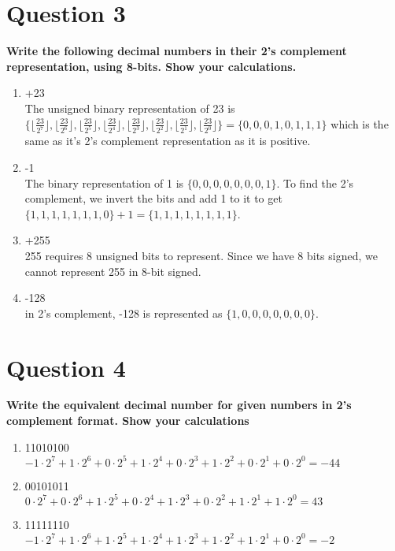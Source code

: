 \section{Question 3}
\textbf{Write the following decimal numbers in their 2's complement representation, using 8-bits. Show your calculations.}
\begin{enumerate}
    \item +23
    \\ The unsigned binary representation of 23 is $\{\lfloor\frac{23}{2^7}\rfloor, \lfloor\frac{23}{2^6}\rfloor, \lfloor\frac{23}{2^5}\rfloor, \lfloor\frac{23}{2^4}\rfloor, \lfloor\frac{23}{2^3}\rfloor, \lfloor\frac{23}{2^2}\rfloor, \lfloor\frac{23}{2^1}\rfloor, \lfloor\frac{23}{2^0}\rfloor\} = \{0, 0, 0, 1, 0, 1, 1, 1\}$
    which is the same as it's 2's complement representation as it is positive.
    \item -1 
    \\ The binary representation of 1 is $\{0, 0, 0, 0, 0, 0, 0, 1\}$. To find the 2's complement, we invert the bits and add 1 to it to get $\{1, 1, 1, 1, 1, 1, 1, 0\} + 1 = \{1, 1, 1, 1, 1, 1, 1, 1\}$. 
    \item +255
    \\ 255 requires 8 unsigned bits to represent. Since we have 8 bits signed, we cannot represent 255 in 8-bit signed.
    \item -128
    \\ in 2's complement, -128 is represented as $\{1, 0, 0, 0, 0, 0, 0, 0\}$. 
\end{enumerate}

\section{Question 4}
\textbf{ Write the equivalent decimal number for given numbers in 2's complement format. Show your calculations}
\begin{enumerate}
    \item 11010100
    \\ $-1\cdot2^7 + 1\cdot2^6 + 0\cdot2^5 + 1\cdot2^4 + 0\cdot2^3 + 1\cdot2^2 + 0\cdot2^1 + 0\cdot2^0 = -44$
    \item 00101011
    \\ $0\cdot2^7 + 0\cdot2^6 + 1\cdot2^5 + 0\cdot2^4 + 1\cdot2^3 + 0\cdot2^2 + 1\cdot2^1 + 1\cdot2^0 = 43$
    \item 11111110
    \\ $-1\cdot2^7 + 1\cdot2^6 + 1\cdot2^5 + 1\cdot2^4 + 1\cdot2^3 + 1\cdot2^2 + 1\cdot2^1 + 0\cdot2^0 = -2$
\end{enumerate}
